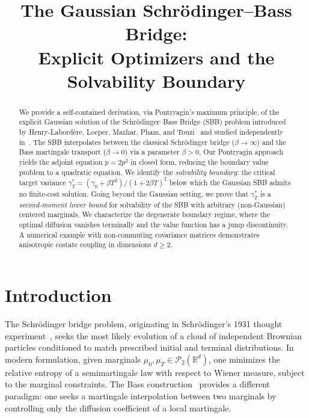 \documentclass[12pt]{article}
\title{The Gaussian Schr\"odinger--Bass Bridge:\\Explicit Optimizers and the Solvability Boundary}
\author{}
\date{}
\theoremstyle{definition}
\newcommand{\R}{\mathbb{R}}
\begin{document}
\maketitle
\thispagestyle{empty}

\begin{abstract}
We provide a self-contained derivation, via Pontryagin's maximum principle,
of the explicit Gaussian solution of the Schr\"odinger--Bass Bridge (SBB)
problem introduced by Henry-Labord\`ere, Loeper, Mazhar, Pham, and
Touzi~\cite{HLMPT26} and studied independently in~\cite{PDE26,LSBB26}.
The SBB interpolates between the classical Schr\"odinger bridge
($\beta\to\infty$) and the Bass martingale transport ($\beta\to 0$) via
a parameter $\beta>0$.
Our Pontryagin approach yields the adjoint equation $\dot p = 2p^2$
in closed form, reducing the boundary value problem to a quadratic equation.
We identify the \emph{solvability boundary}: the critical target variance
$\gamma_T^* = (\gamma_0 + \beta T^2)/(1+2\beta T)^2$
below which the Gaussian SBB admits no finite-cost solution.
Going beyond the Gaussian setting, we prove that $\gamma_T^*$ is
a \emph{second-moment lower bound} for solvability of the SBB with
arbitrary (non-Gaussian) centered marginals.
We characterize the degenerate boundary regime, where the optimal
diffusion vanishes terminally and the value function has a jump
discontinuity.
A numerical example with non-commuting covariance matrices demonstrates
anisotropic costate coupling in dimensions $d \ge 2$.
\end{abstract}

\setcounter{page}{1}

\section{Introduction}\label{sec:intro}

The Schr\"odinger bridge problem, originating in Schr\"odinger's 1931 thought
experiment~\cite{CGP16}, seeks the most likely evolution of a cloud of
independent Brownian particles conditioned to match prescribed initial and
terminal distributions.
In modern formulation, given marginals $\mu_0, \mu_T \in \mathcal{P}_2(\R^d)$,
one minimizes the relative entropy of a semimartingale law with respect to
Wiener measure, subject to the marginal constraints.
The Bass construction~\cite{BHK20} provides a different paradigm: one seeks a
martingale interpolation between two marginals by controlling only the
diffusion coefficient of a local martingale.
\end{document}
